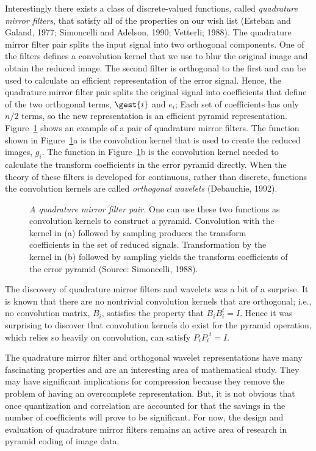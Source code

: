 Interestingly there exists a class of discrete-valued functions,
called {\em quadrature mirror filters}, that satisfy all of the
properties on our wish list (Esteban and Galand, 1977; Simoncelli and
Adelson, 1990; Vetterli; 1988).  The quadrature mirror filter pair
splits the input signal into two orthogonal components.  One of the
filters defines a convolution kernel that we use to blur the original
image and obtain the reduced image.  The second filter is orthogonal
to the first and can be used to calculate an efficient representation
of the error signal.  Hence, the quadrature mirror filter pair splits
the original signal into coefficients that define of the two
orthogonal terms, $\gest{i}$ and $e_i$; Each set of coefficients has
only $n/2$ terms, so the new representation is an efficient pyramid
representation.  Figure~\ref{f7:qmf} shows an example of a pair of
quadrature mirror filters.  The function shown in Figure~\ref{f7:qmf}a
is the convolution kernel that is used to create the reduced images,
$g_i$.  The function in Figure~\ref{f7:qmf}b is the convolution kernel
needed to calculate the transform coefficients in the error pyramid
directly.  When the theory of these filters is developed for
continuous, rather than discrete, functions the convolution kernels
are called {\em orthogonal wavelets} (Debauchie, 1992).
\begin{figure}
\centerline{
}
\caption[Quadrature Mirror Filters]{
{\em A quadrature mirror filter pair.}  One can use these two
functions as convolution kernels to construct a pyramid.  Convolution
with the kernel in (a) followed by sampling produces the transform
coefficients in the set of reduced signals.  Transformation by the
kernel in (b) followed by sampling yields the transform coefficients
of the error pyramid (Source: Simoncelli, 1988).  }
\label{f7:qmf}
\end{figure}

The discovery of quadrature mirror filters and wavelets was a bit of a
surprise.  It is known that there are no nontrivial convolution
kernels that are orthogonal; i.e., no convolution matrix, $B_i$,
satisfies the property that $B_i B_i^t = I$.  Hence it was surprising
to discover that convolution kernels do exist for the pyramid
operation, which relies so heavily on convolution, can satisfy $P_i
{P_i}^t = I$.

The quadrature mirror filter and orthogonal wavelet representations
have many fascinating properties and are an interesting area of
mathematical study.  They may have significant implications for
compression because they remove the problem of having an overcomplete
representation.  But, it is not obvious that once quantization and
correlation are accounted for that the savings in the number of
coefficients will prove to be significant.  For now, the design and
evaluation of quadrature mirror filters remains an active area of
research in pyramid coding of image data.






